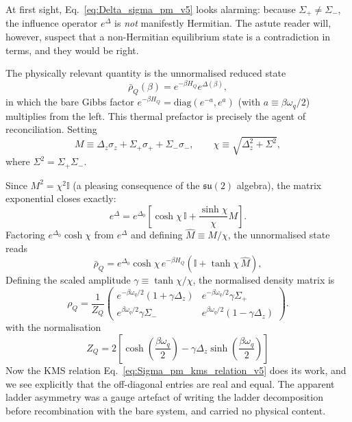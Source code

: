 At first sight, Eq.~\eqref{eq:Delta_sigma_pm_v5} looks alarming: because $\Sigma_+\neq\Sigma_-$,
the influence operator $e^\Delta$ is \emph{not} manifestly Hermitian.  The astute
reader will, however, suspect that a non-Hermitian equilibrium state is a
contradiction in terms, and they would be right.

The physically relevant quantity is the unnormalised reduced state
\begin{equation}
    \bar\rho_Q(\beta)=e^{-\beta H_Q}e^{\Delta(\beta)},
    \label{eq:rho_bar_v5}
\end{equation}
in which the bare Gibbs factor $e^{-\beta H_Q}=\mathrm{diag}(e^{-a},e^{a})$
(with $a\equiv\beta\omega_q/2$) multiplies from the left.  This thermal prefactor
is precisely the agent of reconciliation.  Setting
\begin{equation}
    M\equiv \Delta_z\sigma_z+\Sigma_+\sigma_+ +\Sigma_-\sigma_-,
    \qquad
    \chi\equiv\sqrt{\Delta_z^2+\Sigma^2},
    \label{eq:Mchi_v5}
\end{equation}
where $\Sigma^2={\Sigma_+\Sigma_-}$.

Since $M^2=\chi^2\mathbb{I}$ (a pleasing consequence of the $\mathfrak{su}(2)$
algebra), the matrix exponential closes exactly:
\begin{equation}
    e^\Delta=e^{\Delta_0}\!\left[\cosh\chi\,\mathbb{I}+\frac{\sinh\chi}{\chi}M\right].
    \label{eq:expDelta_closed_v5}
\end{equation}
Factoring $e^{\Delta_0}\cosh\chi$ from $e^{\Delta}$ and defining $\hat{M}\equiv M/\chi$, the unnormalised state reads
\begin{equation}
    \bar\rho_Q=e^{\Delta_0}\cosh\chi\,
    e^{-\beta H_Q}\!\left(\mathbb{I}+\tanh\chi\,\hat{M}\right),
    \label{eq:rho_bar_factored_v5}
\end{equation}
Defining the scaled amplitude $\gamma\equiv\tanh\chi/\chi$, the normalised density matrix is
\begin{equation}
    \rho_Q = \frac{1}{Z_Q}
    \begin{pmatrix}
        e^{-\beta\omega_q/2}\!\left(1+\gamma\Delta_z\right) & e^{-\beta\omega_q/2}\gamma\Sigma_+ \\
        e^{\beta\omega_q/2}\gamma\Sigma_- & e^{\beta\omega_q/2}\!\left(1-\gamma\Delta_z\right)
    \end{pmatrix}.
    \label{eq:rho_matrix_v5}
\end{equation}
with the normalisation
\begin{equation}
Z_Q=2\left[\cosh\left(\frac{\beta\omega_q}{2}\right)-\gamma\Delta_z\sinh\left(\frac{\beta\omega_q}{2}\right)\right]
\end{equation}
Now the KMS relation Eq.~\eqref{eq:Sigma_pm_kms_relation_v5} does its work, and we see explicitly that the off-diagonal entries are real and equal.  The apparent ladder asymmetry was a gauge
artefact of writing the ladder decomposition before recombination with the bare system, and carried no physical content.

